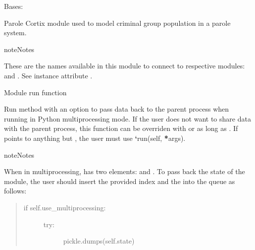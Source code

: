 \documentclass[letterpaper,10pt,openany,oneside,english]{sphinxmanual}
\begin{document}
\begin{fulllineitems}
\label{\detokenize{examples_rst/parole:parole.Parole}}
Bases: 

Parole Cortix module used to model criminal group population in a parole system.

\begin{sphinxadmonition}{note}{Notes}

These are the  names available in this module to connect to respective
modules:  and .
See instance attribute .
\end{sphinxadmonition}

\begin{fulllineitems}
\label{\detokenize{examples_rst/parole:parole.Parole.run}}
Module run function

Run method with an option to pass data back to the parent process when running
in Python multiprocessing mode. If the user does not want to share data with
the parent process, this function can be overriden with 
or  as long as .
If  points to anything but , the user must use
{\color{red}\bfseries{}{}`}run(self, {\color{red}\bfseries{}*}args).

\begin{sphinxadmonition}{note}{Notes}

When in multiprocessing,  has two elements:  and .
To pass back the state of the module, the user should insert the provided
index  and the  into the queue as follows:
\begin{quote}
\begin{description}
\item[{if self.use\_multiprocessing:}] \leavevmode\begin{description}
\item[{try:}] \leavevmode
pickle.dumps(self.state)


\end{description}
\end{description}
\end{quote}
\end{sphinxadmonition}
\end{fulllineitems}
\end{fulllineitems}
\end{document}
